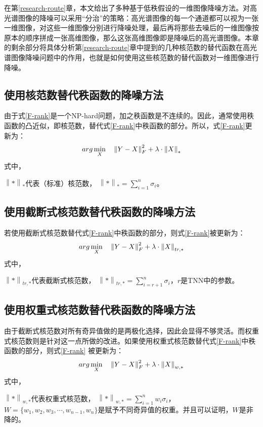 \documentclass[12pt, a4paper]{article}
\begin{document}
\par 在第\ref{research-route}章，本文给出了多种基于低秩假设的一维图像降噪方法。对高光谱图像的降噪可以采用“分治”的策略：高光谱图像的每一个通道都可以视为一张一维图像，对这些一维图像分别进行降噪处理，最后再将那些去噪后的一维图像按原本的顺序拼成一张高维图像，那么这张高维图像即是降噪后的高光谱图像。本章的剩余部分将具体分析第\ref{research-route}章中提到的几种核范数的替代函数在高光谱图像降噪问题中的作用，也就是如何使用这些核范数的替代函数对一维图像进行降噪。
\newline
\subsection{使用核范数替代秩函数的降噪方法}
\par 由于式\ref{F-rank}是一个NP-hard问题，加之秩函数是不连续的。因此，通常使用秩函数的凸近似，即核范数，替代式\ref{F-rank}中秩函数的部分。所以，式\ref{F-rank}更新为：
\begin{equation}
\centering
arg\min\limits_{X} \quad \left\|Y-X\right\|_F^2 + \lambda \cdot \left\|X\right\|_*
\label{F-nn}
\end{equation}
式中，
\par$\left\|*\right\|_*$代表（标准）核范数，
$
\left\|*\right\|_* = \sum\limits_{i=1}^{n}\sigma_i
$。
\subsection{使用截断式核范数替代秩函数的降噪方法}
\par 若使用截断式核范数替代式\ref{F-rank}中秩函数的部分，则式\ref{F-rank}被更新为：
\begin{equation}
\centering
arg\min\limits_{X} \quad \left\|Y-X\right\|_F^2 + \lambda \cdot \left\|X\right\|_{tr,*}
\label{F-tnn}
\end{equation}
式中，
\par$\left\|*\right\|_{tr,*}$代表截断式核范数，
$
\left\|*\right\|_{tr,*} = \sum\limits_{i=r+1}^{n}\sigma_i
$，$r$是TNN中的参数。
\subsection{使用权重式核范数替代秩函数的降噪方法}
\par 由于截断式核范数对所有奇异值做的是两极化选择，因此会显得不够灵活。而权重式核范数则是针对这一点所做的改进。如果使用权重式核范数替代式\ref{F-rank}中秩函数的部分，则式\ref{F-rank} 被更新为：
\begin{equation}
\centering
arg\min\limits_{X} \quad \left\|Y-X\right\|_F^2 + \lambda \cdot \left\|X\right\|_{w,*}
\label{F-wnn}
\end{equation}
式中，
\par$\left\|*\right\|_{w,*}$代表权重式核范数，
$
\left\|*\right\|_{w,*} = \sum\limits_{i=1}^{n}w_i\sigma_i
$，$W=\{w_1, w_2, w_3, \cdots, w_{n-1}, w_{n}\}$是赋予不同奇异值的权重。并且可以证明，$W$是非降的。
\end{document}
